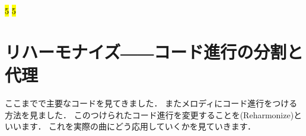 \documentclass[dvipdfmx,uplatex,b5paper,openany,jbase=12Q,nomag*,textwidth-limit=44%
               ]{gachimuchi}
\begin{document}
\begin{Music}[\linewidth]
  \en\setdoublebar%
  \endpiece%
  \generalmeter{\meterC}%
  \Startpiece%
  \NOtes%
  \en\Notes%
  \cchordsl{(\Cross)}%
  \cchordsl{\Cross}%
  \cchordsl{\Cross}%
  \en\xbar%
  \NOtes%
  \en\Notes%
  \cchordsl{\Cross}%
  \en\NOtesp%
  \en\Notes%
  \en\xbar%
  \NOtes%
  \cchordsl{\Cross}%
  \en\Notes%
  \cchordsl{\Cross}%
  \cchordsl{\Cross}%
  \en\xbar%
  \NOtes%
  \cchordsl{\Cross}%
  \en\Notes%
  \en\NOTes%
  \hl{5}%
  \en\setdoublebar%
  \endpiece%
  \generalmeter{\meterC}%
  \Startpiece%
  \NOtes%
  \cchordsl{\Cross}%
  \en\Notes%
  \cchordsl{\Cross}%
  \cchordsl{(\Cross)}%
  \cchordsl{\Cross}%
  \en\xbar%
  \NOtes%
  \cchordsl{\Cross}%
  \en\Notes%
  \cchordsl{\Cross}%
  \en\NOtesp%
  \en\Notes%
  \en\xbar%
  \NOtes%
  \cchordsl{\Cross}%
  \en\Notes%
  \cchordsl{\Cross}%
  \cchordsl{\Cross}%
  \cchordsl{\Cross}%
  \en\xbar%
  \NOtes%
  \en\Notes%
  \cchordsl{\Cross}%
  \cchordsl{\Cross}%
  \en\NOTes%
  \hl{5}%
  \en\setdoublebar%
  \endpiece%
\end{Music}

\chapter{リハーモナイズ――コード進行の分割と代理}
ここまでで主要なコードを見てきました．
またメロディにコード進行をつける方法を見ました．
このつけられたコード進行を変更することを\xkanjispace(Reharmonize)といいます．
これを実際の曲にどう応用していくかを見ていきます．
\end{document}
